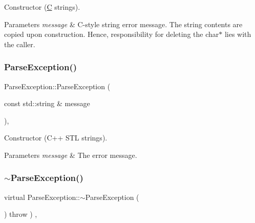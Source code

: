Constructor (\hyperlink{classC}{C} strings). 
\begin{DoxyParams}{Parameters}
{\em message} & C-\/style string error message. The string contents are copied upon construction. Hence, responsibility for deleting the char$\ast$ lies with the caller. \\
\hline
\end{DoxyParams}
\mbox{\label{classParseException_a162b338172e869ef6e308b4489abf95b}} 
\subsubsection{\texorpdfstring{Parse\+Exception()}{ParseException()}\hspace{0.1cm}{\footnotesize\ttfamily [6/6]}}
{\footnotesize\ttfamily Parse\+Exception\+::\+Parse\+Exception (\begin{DoxyParamCaption}\item[{const std\+::string \&}]{message }\end{DoxyParamCaption})\hspace{0.3cm}{\ttfamily [inline]}, {\ttfamily [explicit]}}

Constructor (C++ S\+TL strings). 
\begin{DoxyParams}{Parameters}
{\em message} & The error message. \\
\hline
\end{DoxyParams}
\mbox{\label{classParseException_a59f11745728ad1ede341f2dda48e79b6}} 
\subsubsection{\texorpdfstring{$\sim$\+Parse\+Exception()}{~ParseException()}\hspace{0.1cm}{\footnotesize\ttfamily [3/3]}}
{\footnotesize\ttfamily virtual Parse\+Exception\+::$\sim$\+Parse\+Exception (\begin{DoxyParamCaption}{ }\end{DoxyParamCaption}) throw  ) \hspace{0.3cm}{\ttfamily [inline]}, {\ttfamily [virtual]}}

